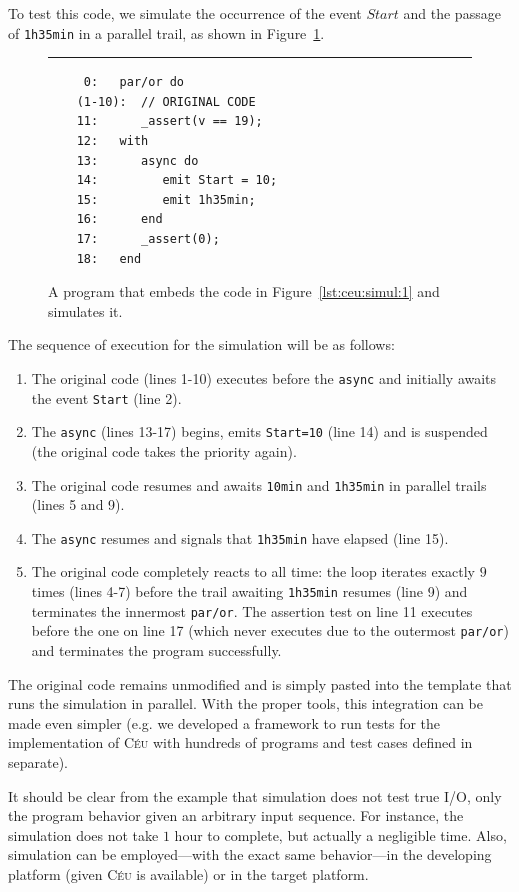 \documentclass[11pt,a4paper]{article}
\newcommand{\2}{\;\;}
\newcommand{\5}{\;\;\;\;\;}
\newcommand{\CEU}{\textsc{C\'{e}u}}
\newcommand{\code}[1] {{\small{\texttt{#1}}}}
\begin{document}
To test this code, we simulate the occurrence of the event $Start$ and the 
passage of \code{1h35min} in a parallel trail, as shown in 
Figure~\ref{lst:ceu:simul:2}.

\begin{figure}[h]
\rule{15cm}{0.37pt}
{\small
\begin{verbatim}
     0:   par/or do
    (1-10):  // ORIGINAL CODE
    11:      _assert(v == 19);
    12:   with
    13:      async do
    14:         emit Start = 10;
    15:         emit 1h35min;
    16:      end
    17:      _assert(0);
    18:   end
\end{verbatim}
}
\caption{ A program that embeds the code in Figure~\ref{lst:ceu:simul:1} and 
simulates it.
\label{lst:ceu:simul:2}
}
\end{figure}

\newpage
The sequence of execution for the simulation will be as follows:

{\small
\begin{enumerate}
\setlength{\itemsep}{0pt}
\item The original code (lines 1-10) executes before the \code{async} and 
initially awaits the event \code{Start} (line 2).
\item The \code{async} (lines 13-17) begins, emits \code{Start=10} (line 14) 
and is suspended (the original code takes the priority again).
\item The original code resumes and awaits \code{10min} and \code{1h35min} in 
parallel trails (lines 5 and 9).
\item The \code{async} resumes and signals that \code{1h35min} have elapsed 
(line 15).
\item The original code completely reacts to all time: the loop iterates 
exactly $9$ times (lines 4-7) before the trail awaiting \code{1h35min} resumes 
(line 9) and terminates the innermost \code{par/or}.
The assertion test on line 11 executes before the one on line 17 (which never 
executes due to the outermost \code{par/or}) and terminates the program 
successfully.
\end{enumerate}
}

The original code remains unmodified and is simply pasted into the template 
that runs the simulation in parallel.
With the proper tools, this integration can be made even simpler (e.g. we 
developed a framework to run tests for the implementation of \CEU{} with 
hundreds of programs and test cases defined in separate).

It should be clear from the example that simulation does not test true I/O, 
only the program behavior given an arbitrary input sequence.
For instance, the simulation does not take $1$ hour to complete, but actually a 
negligible time.
Also, simulation can be employed---with the exact same behavior---in the 
developing platform (given \CEU{} is available) or in the target platform.
\end{document}
